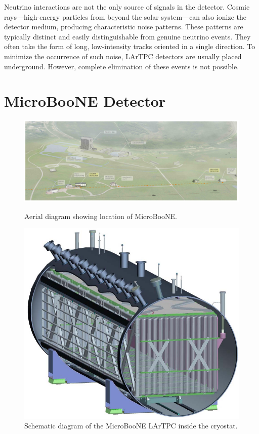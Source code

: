 \documentclass{pracalicmgr}
\begin{document}
Neutrino interactions are not the only source of signals in the detector. Cosmic rays—high-energy particles from beyond the solar system—can also ionize the detector medium, producing characteristic noise patterns. These patterns are typically distinct and easily distinguishable from genuine neutrino events. They often take the form of long, low-intensity tracks oriented in a single direction. To minimize the occurrence of such noise, LArTPC detectors are usually placed underground. However, complete elimination of these events is not possible.


\section{MicroBooNE Detector}


\begin{figure}[H]
    \centering
    \begin{minipage}[t]{0.48\textwidth}
        \centering
        \includegraphics[width=\textwidth]{src/microbooneBirdseyes.pdf}
        \caption{Aerial diagram showing location of MicroBooNE.}
        \label{fig:microboone_birdseye}
    \end{minipage}
    \hfill
    \begin{minipage}[t]{0.48\textwidth}
        \centering
        \includegraphics[width=\textwidth]{src/microBooNe_Layout.pdf}
        \caption{Schematic diagram of the MicroBooNE LArTPC inside the cryostat.}
        \label{fig:microboone_layout}
    \end{minipage}
\end{figure}
\end{document}
